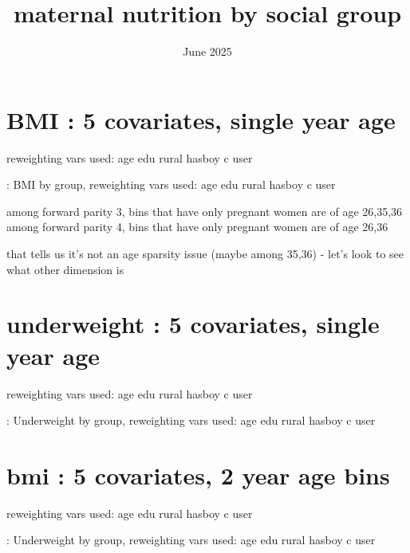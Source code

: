 \documentclass{article}
\title{maternal nutrition by social group}
\date{June 2025}
\begin{document}
\maketitle


\section{BMI : 5 covariates, single year age }

reweighting vars used: age edu rural hasboy c user

\begin{table}[H]
    \centering
    \footnotesize %
    \caption{: BMI by group, reweighting vars used: age edu rural hasboy c user}
    \label{tab:sumstat}
\end{table}


among forward parity 3, bins that have only pregnant women are of age 26,35,36
among forward parity 4, bins that have only pregnant women are of age 26,36

that tells us it's not an age sparsity issue (maybe among 35,36) - let's look to see what other dimension is

\section{underweight : 5 covariates, single year age }

reweighting vars used: age edu rural hasboy c user

\begin{table}[H]
    \centering
    \footnotesize %
    \caption{: Underweight by group, reweighting vars used: age edu rural hasboy c user}
    \label{tab:sumstat}
\end{table}


\newpage

\section{bmi : 5 covariates, 2 year age bins }

reweighting vars used: age edu rural hasboy c user

\begin{table}[H]
    \centering
    \footnotesize %
    \caption{: Underweight by group, reweighting vars used: age edu rural hasboy c user}
    \label{tab:sumstat}
\end{table}
\end{document}
